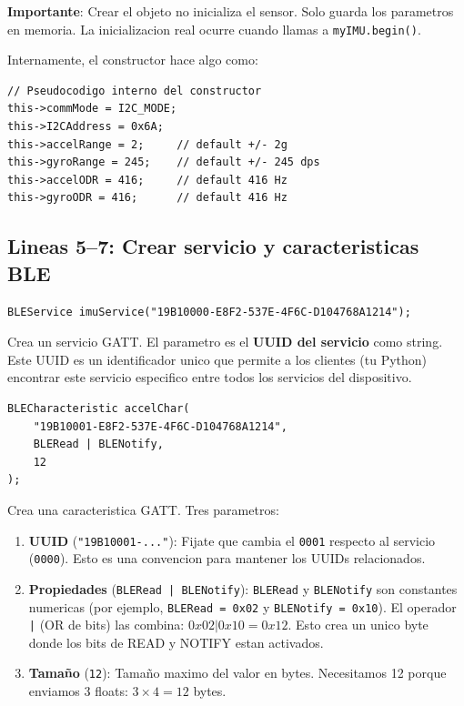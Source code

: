 \documentclass[11pt,a4paper]{article}
\begin{document}
\textbf{Importante}: Crear el objeto no inicializa el sensor. Solo
guarda los parametros en memoria. La inicializacion real ocurre
cuando llamas a \texttt{myIMU.begin()}.

Internamente, el constructor hace algo como:
\begin{lstlisting}[style=arduino]
// Pseudocodigo interno del constructor
this->commMode = I2C_MODE;
this->I2CAddress = 0x6A;
this->accelRange = 2;     // default +/- 2g
this->gyroRange = 245;    // default +/- 245 dps
this->accelODR = 416;     // default 416 Hz
this->gyroODR = 416;      // default 416 Hz
\end{lstlisting}

\subsection{Lineas 5--7: Crear servicio y caracteristicas BLE}

\begin{lstlisting}[style=arduino]
BLEService imuService("19B10000-E8F2-537E-4F6C-D104768A1214");
\end{lstlisting}

Crea un servicio GATT. El parametro es el \textbf{UUID del servicio}
como string. Este UUID es un identificador unico que permite a los
clientes (tu Python) encontrar este servicio especifico entre todos
los servicios del dispositivo.

\begin{lstlisting}[style=arduino]
BLECharacteristic accelChar(
    "19B10001-E8F2-537E-4F6C-D104768A1214",
    BLERead | BLENotify,
    12
);
\end{lstlisting}

Crea una caracteristica GATT. Tres parametros:

\begin{enumerate}
    \item \textbf{UUID} (\texttt{"19B10001-..."}): Fijate que cambia
          el \texttt{0001} respecto al servicio (\texttt{0000}). Esto
          es una convencion para mantener los UUIDs relacionados.

    \item \textbf{Propiedades} (\texttt{BLERead | BLENotify}):
          \texttt{BLERead} y \texttt{BLENotify} son constantes
          numericas (por ejemplo, \texttt{BLERead = 0x02} y
          \texttt{BLENotify = 0x10}). El operador \texttt{|}
          (OR de bits) las combina: $0x02 | 0x10 = 0x12$. Esto
          crea un unico byte donde los bits de READ y NOTIFY estan
          activados.

    \item \textbf{Tamaño} (\texttt{12}): Tamaño maximo del valor en
          bytes. Necesitamos 12 porque enviamos 3 floats:
          $3 \times 4 = 12$ bytes.
\end{enumerate}
\end{document}
